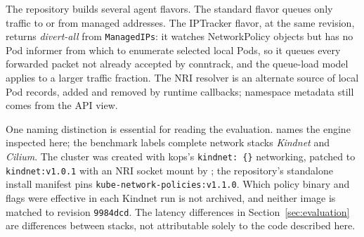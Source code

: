 The repository builds several agent flavors. The standard flavor queues
only traffic to or from managed addresses. The IPTracker flavor, at the
same revision, returns \emph{divert-all} from \texttt{ManagedIPs}: it
watches NetworkPolicy objects but has no Pod informer from which to
enumerate selected local Pods, so it queues every forwarded packet not
already accepted by conntrack, and the queue-load model applies to a
larger traffic fraction. The NRI resolver is an alternate source of local
Pod records, added and removed by runtime callbacks; namespace metadata
still comes from the API view.

One naming distinction is essential for reading the evaluation. \sys{}
names the engine inspected here; the benchmark labels complete network
stacks \emph{Kindnet} and \emph{Cilium}. The \sys{} cluster was created
with kops's \texttt{kindnet: \{\}} networking, patched to
\texttt{kindnet:v1.0.1} with an NRI socket mount by
; the repository's standalone install
manifest pins \texttt{kube-network-policies:v1.1.0}. Which policy
binary and flags were effective in each Kindnet run is not archived, and
neither image is matched to revision \texttt{9984dcd}. The latency
differences in Section~\ref{sec:evaluation} are differences between
stacks, not attributable solely to the code described here.
